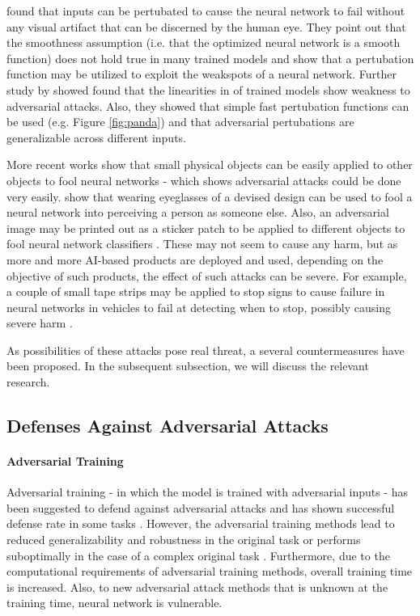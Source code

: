 \documentclass[11pt]{article}
\begin{document}
\citet{szegedy2013intriguing} found that inputs can be pertubated to cause the neural network to fail without any visual artifact that can be discerned by the human eye. They point out that the smoothness assumption (i.e. that the optimized neural network is a smooth function) does not hold true in many trained models and show that a pertubation function may be utilized to exploit the weakspots of a neural network. Further study by \citet{Goodfellow2015adversarial} showed found that the linearities in of trained models show weakness to adversarial attacks. Also, they showed that simple fast pertubation functions can be used (e.g. Figure \ref{fig:panda}) and that adversarial pertubations are generalizable across different inputs. 

More recent works show that small physical objects can be easily applied to other objects to fool neural networks - which shows adversarial attacks could be done very easily. \citet{2019glasses} show that wearing eyeglasses of a devised design can be used to fool a neural network into perceiving a person as someone else. Also, an adversarial image may be printed out as a sticker patch to be applied to different objects to fool neural network classifiers \cite{brown2018adversarial}. These may not seem to cause any harm, but as more and more AI-based products are deployed and used, depending on the objective of such products, the effect of such attacks can be severe. For example, a couple of small tape strips may be applied to stop signs to cause failure in neural networks in vehicles to fail at detecting when to stop, possibly causing severe harm \cite{stopsign}.

As possibilities of these attacks pose real threat, a several countermeasures have been proposed. In the subsequent subsection, we will discuss the relevant research.



\subsection{Defenses Against Adversarial Attacks\label{sec:countermeasures}}

\paragraph{Adversarial Training}

Adversarial training - in which the model is trained with adversarial inputs - has been suggested to defend against adversarial attacks and has shown successful defense rate in some tasks \cite{buckman2018thermometer, whitebox}. However, the adversarial training methods lead to reduced generalizability and robustness in  the original task \cite{onrecent} or performs suboptimally in the case of a complex original task \cite{buckman2018thermometer}. Furthermore, due to the computational requirements of adversarial training methods, overall training time is increased. Also, to new adversarial attack methods that is unknown at the training time, neural network is vulnerable.
\end{document}
